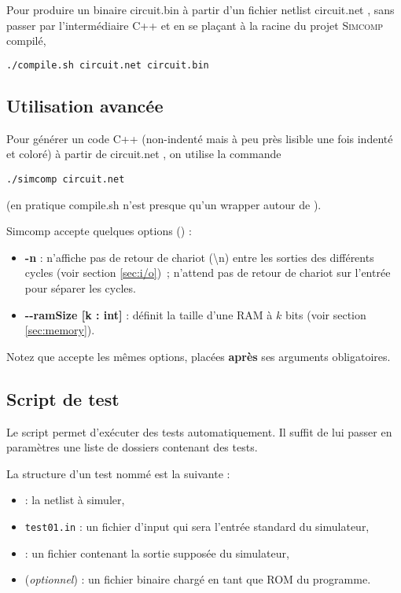 \documentclass[11pt,a4paper]{article}
\begin{document}
Pour produire un binaire \og circuit.bin \fg{} à partir d'un fichier netlist \og circuit.net \fg{}, sans passer par l'intermédiaire C++ et en se plaçant à la racine du projet \textsc{Simcomp} compilé,
\begin{lstlisting}[language=bash]
./compile.sh circuit.net circuit.bin
\end{lstlisting}

\subsection{Utilisation avancée}

Pour générer un code C++ (non-indenté mais à peu près lisible une fois indenté et coloré) à partir de \og circuit.net \fg{}, on utilise la commande
\begin{lstlisting}
./simcomp circuit.net
\end{lstlisting}
(en pratique compile.sh n'est presque qu'un wrapper autour de ).
\vspace{1em}

Simcomp accepte quelques options () :
\begin{itemize}
\item \textbf{-n} : n'affiche pas de retour de chariot (\textbackslash n) entre les sorties des différents cycles (voir section \ref{sec:i/o})~; n'attend pas de retour de chariot sur l'entrée pour séparer les cycles.
\item \textbf{-{}-ramSize [k : int]} : définit la taille d'une RAM à $k$ bits (voir section \ref{sec:memory}).
\end{itemize}
\vspace{1em}

Notez que  accepte les mêmes options, placées \textbf{après} ses arguments obligatoires.

\subsection{Script de test}

Le script  permet d'exécuter des tests automatiquement. Il suffit de lui passer en paramètres une liste de dossiers contenant des tests.

La structure d'un test nommé  est la suivante :
\begin{itemize}
\item {} : la netlist à simuler,
\item \lstinline`test01.in` : un fichier d'input qui sera l'entrée standard du simulateur,
\item {} : un fichier contenant la sortie supposée du simulateur,
\item {} (\emph{optionnel}) : un fichier binaire chargé en tant que ROM du programme.
\end{itemize}
\end{document}
